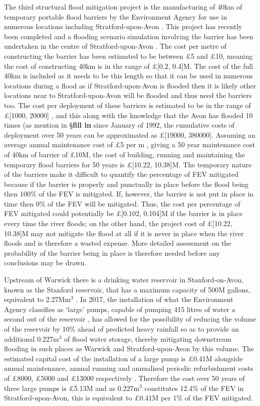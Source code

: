 \documentclass[11pt,a4paper]{article}
\begin{document}
The third structural flood mitigation project is the manufacturing of 40km of temporary portable flood barriers by the Environment Agency for use in numerous locations including Stratford-upon-Avon \cite{lentemp}. This project has recently been completed and a flooding scenario simulation involving the barrier has been undertaken in the centre of Stratford-upon-Avon \cite{strat-flood}. The cost per metre of constructing the barrier has been estimated to be between \pounds5 and \pounds10, meaning the cost of constructing 40km is in the range of \pounds[0.2, 0.4]M. The cost of the full 40km is included as it needs to be this length so that it can be used in numerous locations during a flood as if Stratford-upon-Avon is flooded then it is likely other locations near to Stratford-upon-Avon will be flooded and thus need the barriers too. The cost per deployment of these barriers is estimated to be in the range of \pounds[1000, 20000] \cite{temp}, and this along with the knowledge that the Avon has flooded 10 times (as mention in \S\textbf{fill in} since January of 1992, the cumulative costs of deployment over 50 years can be approximated as \pounds[19000, 380000]. Assuming an average annual maintenance cost of \pounds5 per m \cite{cost1}, giving a 50 year maintenance cost of 40km of barrier of \pounds10M, the cost of building, running and maintaining the temporary flood barriers for 50 years is \pounds[10.22, 10.38]M. The temporary nature of the barriers make it difficult to quantify the percentage of FEV mitigated because if the barrier is properly and punctually in place before the flood being then 100\% of the FEV is mitigated. If, however, the barrier is not put in place in time then 0\% of the FEV will be mitigated. Thus, the cost per percentage of FEV mitigated could potentially be \pounds[0.102, 0.104]M if the barrier is in place every time the river floods{;} on the other hand, the project cost of \pounds[10.22, 10.38]M may not mitigate the flood at all if it is never in place when the river floods and is therefore a wasted expense. More detailed assessment on the probability of the barrier being in place is therefore needed before any conclusions may be drawn.

Upstream of Warwick there is a drinking water reservoir in Stanford-on-Avon, known as the Stanford reservoir, that has a maximum capacity of 500M gallons, equivalent to 2.27Mm$^3$ \cite{volume}. In 2017, the installation of what the Environment Agency classifies as `large' pumps, capable of pumping 415 litres of water a second out of the reservoir \cite{pump}, has allowed for the possibility of reducing the volume of the reservoir by 10\% ahead of predicted heavy rainfall so as to provide an additional 0.227m$^3$ of flood water storage, thereby mitigating downstream flooding in such places as Warwick and Stratford-upon-Avon by this volume. The estimated capital cost of the installation of a large pump is \pounds0.41M alongside annual maintenance, annual running and annualised periodic refurbishment costs of \pounds8000, \pounds5000 and \pounds13000 respectively \cite{cost2}. Therefore the cost over 50 years of three large pumps is \pounds5.13M and as 0.227m$^3$ constitutes 12.4\% of the FEV in Stratford-upon-Avon, this is equivalent to \pounds0.41M per 1\% of the FEV mitigated.
\end{document}
